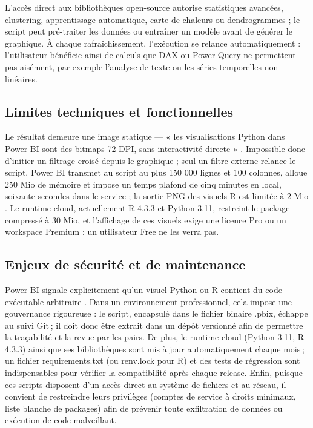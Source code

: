L’accès direct aux bibliothèques open-source autorise statistiques avancées, clustering, apprentissage automatique, carte de chaleurs ou dendrogrammes ; le script peut pré-traiter les données ou entraîner un modèle avant de générer le graphique.  
À chaque rafraîchissement, l’exécution se relance automatiquement : l’utilisateur bénéficie ainsi de calculs que DAX ou Power Query ne permettent pas aisément, par exemple l’analyse de texte ou les séries temporelles non linéaires.

\subsection{Limites techniques et fonctionnelles}

Le résultat demeure une image statique — « les visualisations Python dans Power BI sont des bitmaps 72 DPI, sans interactivité directe » \parencite{MicrosoftPythonRVisualsDocs2024}.  
Impossible donc d’initier un filtrage croisé depuis le graphique ; seul un filtre externe relance le script.  
Power BI transmet au script au plus 150 000 lignes et 100 colonnes, alloue 250 Mio de mémoire et impose un temps plafond de cinq minutes en local, soixante secondes dans le service ; la sortie PNG des visuels R est limitée à 2 Mio \parencite{MicrosoftRPackagesService2025}.  
Le runtime cloud, actuellement R 4.3.3 et Python 3.11, restreint le package compressé à 30 Mio, et l’affichage de ces visuels exige une licence Pro ou un workspace Premium : un utilisateur Free ne les verra pas.

\subsection{Enjeux de sécurité et de maintenance}

Power BI signale explicitement qu’un visuel Python ou R contient du code exécutable arbitraire \parencite{MicrosoftPythonRVisualsDocs2024}.  
Dans un environnement professionnel, cela impose une gouvernance rigoureuse : le script, encapsulé dans le fichier binaire .pbix, échappe au suivi Git ; il doit donc être extrait dans un dépôt versionné afin de permettre la traçabilité et la revue par les pairs. De plus, le runtime cloud (Python 3.11, R 4.3.3) ainsi que ses bibliothèques sont mis à jour automatiquement chaque mois ; un fichier requirements.txt (ou renv.lock pour R) et des tests de régression sont indispensables pour vérifier la compatibilité après chaque release. Enfin, puisque ces scripts disposent d’un accès direct au système de fichiers et au réseau, il convient de restreindre leurs privilèges (comptes de service à droits minimaux, liste blanche de packages) afin de prévenir toute exfiltration de données ou exécution de code malveillant.

